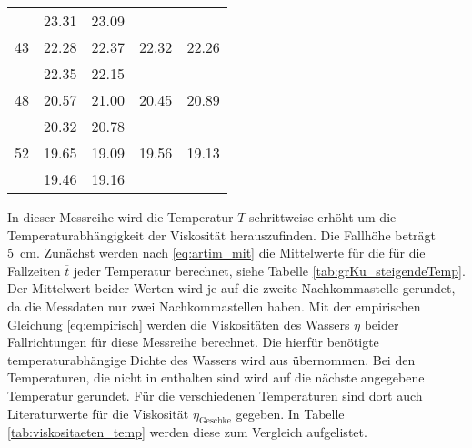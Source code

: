 \begin{table}[H]
\begin{tabular}{S[table-format=2.0] S[table-format=2.2] S  S  S }
               & 23.31 &  23.09 &           &           \\
            43 & 22.28 &  22.37 &   22.32   &  22.26    \\
               & 22.35 &  22.15 &           &           \\
            48 & 20.57 &  21.00 &   20.45   &  20.89    \\
               & 20.32 &  20.78 &           &           \\
            52 & 19.65 &  19.09 &   19.56   &  19.13    \\
               & 19.46 &  19.16 &           &           \\
        \bottomrule  
    \end{tabular}
\end{table}
In dieser Messreihe wird die Temperatur $T$ schrittweise erhöht um die Temperaturabhängigkeit der Viskosität herauszufinden.
Die Fallhöhe beträgt \qty[]{5}{\cm}.
Zunächst werden nach \eqref{eq:artim_mit} die Mittelwerte für die für die Fallzeiten $\overline{t}$ jeder Temperatur berechnet,
siehe Tabelle \ref{tab:grKu_steigendeTemp}.
Der Mittelwert beider Werten wird je auf die zweite Nachkommastelle gerundet,
da die Messdaten nur zwei Nachkommastellen haben.
Mit der empirischen Gleichung \eqref{eq:empirisch} werden die Viskositäten des Wassers $\eta$ beider Fallrichtungen für diese Messreihe berechnet.
Die hierfür benötigte temperaturabhängige Dichte des Wassers wird aus \cite[][290]{geschke} übernommen. 
Bei den Temperaturen, die nicht in \cite[][290]{geschke} enthalten sind wird auf die nächste angegebene Temperatur gerundet.
Für die verschiedenen Temperaturen sind dort auch Literaturwerte für die Viskosität $\eta_\text{Geschke}$ gegeben. 
In Tabelle \ref{tab:viskositaeten_temp} werden diese zum Vergleich aufgelistet.
%
